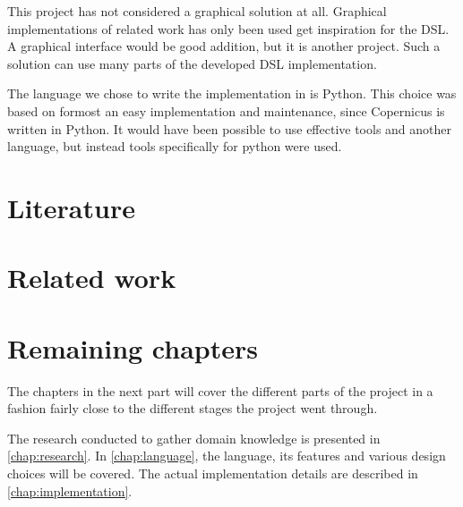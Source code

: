 This project has not considered a graphical solution at all. Graphical
implementations of related work has only been used get inspiration for
the DSL. A graphical interface would be good addition, but it is
another project. Such a solution can use many parts of the developed
DSL implementation.

The language we chose to write the implementation in is Python. This
choice was based on formost an easy implementation and maintenance,
since Copernicus is written in Python. It would have been possible to
use effective tools and another language, but instead tools
specifically for python were used.




\section{Literature}


\section{Related work}


\section{Remaining chapters}
The chapters in the next part will cover the different parts of the
project in a fashion fairly close to the different stages the project
went through.

The research conducted to gather domain knowledge is presented in
\autoref{chap:research}. In \autoref{chap:language}, the language, its
features and various design choices will be covered. The actual
implementation details are described in \autoref{chap:implementation}.
